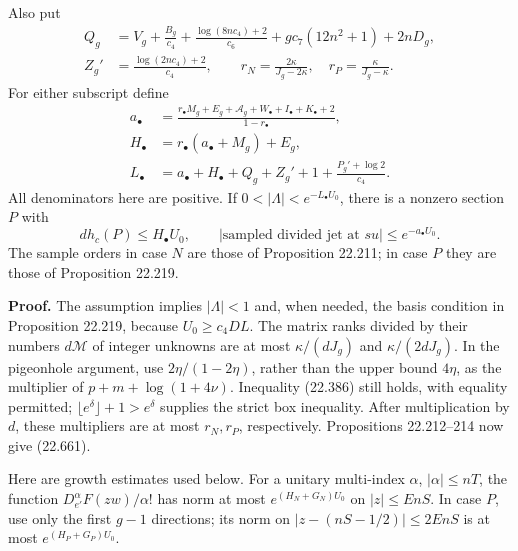 \documentclass[
  11pt,
  a4paper,
]{article}
\begin{document}
Also put \[
 \begin{split}
 Q_g&=V_g+\frac{B_g}{c_4}+
       \frac{\log(8nc_4)+2}{c_6}
       +g c_7(12n^2+1)+2nD_g,\\
 Z_g'&=\frac{\log(2nc_4)+2}{c_4},\qquad
 r_N=\frac{2\kappa}{J_g-2\kappa},\quad
 r_P=\frac{\kappa}{J_g-\kappa}.
 \end{split}
 \tag{22.659}
\] For either subscript define \[
 \begin{split}
 a_\bullet&=
 \frac{r_\bullet M_g+E_g+\mathcal A_g+W_\bullet+
                         I_\bullet+K_\bullet+2}{1-r_\bullet},\\
 H_\bullet&=r_\bullet(a_\bullet+M_g)+E_g,\\
 L_\bullet&=a_\bullet+H_\bullet+Q_g+Z_g'+1+
                          \frac{P_g'+\log2}{c_4}.
 \end{split}
 \tag{22.660}
\] All denominators here are positive. If
\(0<|\Lambda|<e^{-L_\bullet U_0}\), there is a nonzero section \(P\)
with \[
 d h_c(P)\le H_\bullet U_0,
 \qquad |\text{sampled divided jet at }su|
                                      \le e^{-a_\bullet U_0}.
 \tag{22.661}
\] The sample orders in case \(N\) are those of Proposition 22.211; in
case \(P\) they are those of Proposition 22.219.

\textbf{Proof.} The assumption implies \(|\Lambda|<1\) and, when needed,
the basis condition in Proposition 22.219, because \(U_0\ge c_4DL\). The
matrix ranks divided by their numbers \(d\mathcal M\) of integer
unknowns are at most \(\kappa/(dJ_g)\) and \(\kappa/(2dJ_g)\). In the
pigeonhole argument, use \(2\eta/(1-2\eta)\), rather than the upper
bound \(4\eta\), as the multiplier of \(p+m+\log(1+4\nu)\). Inequality
(22.386) still holds, with equality permitted;
\(\lfloor e^\delta\rfloor+1>e^\delta\) supplies the strict box
inequality. After multiplication by \(d\), these multipliers are at most
\(r_N,r_P\), respectively. Propositions 22.212--214 now give (22.661).

Here are growth estimates used below. For a unitary multi-index
\(\alpha\), \(|\alpha|\le nT\), the function
\(D_{e'}^\alpha F(zw)/\alpha!\) has norm at most \(e^{(H_N+G_N)U_0}\) on
\(|z|\le EnS\). In case \(P\), use only the first \(g-1\) directions;
its norm on \(|z-(nS-1/2)|\le2EnS\) is at most \(e^{(H_P+G_P)U_0}\).
\end{document}
